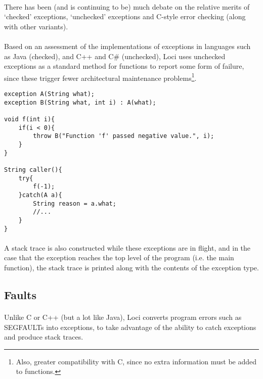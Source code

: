 \documentclass[12pt,twoside,notitlepage]{report}
\begin{document}
\paragraph{}
There has been (and is continuing to be) much debate on the relative merits of `checked' exceptions, `unchecked' exceptions and C-style error checking (along with other variants).

\paragraph{}
Based on an assessment of the implementations of exceptions in languages such as Java (checked), and C++ and C\# (unchecked), Loci uses unchecked exceptions as a standard method for functions to report some form of failure, since these trigger fewer architectural maintenance problems\footnote{Also, greater compatibility with C, since no extra information must be added to functions.}.


\begin{lstlisting}
exception A(String what);
exception B(String what, int i) : A(what);

void f(int i){
	if(i < 0){
		throw B("Function 'f' passed negative value.", i);
	}
}

String caller(){
	try{
		f(-1);
	}catch(A a){
		String reason = a.what;
		//...
	}
}
\end{lstlisting}


\paragraph{}
A stack trace is also constructed while these exceptions are in flight, and in the case that the exception reaches the top level of the program (i.e. the main function), the stack trace is printed along with the contents of the exception type.

\clearpage

\subsection{Faults}

\paragraph{}
Unlike C or C++ (but a lot like Java), Loci converts program errors such as SEGFAULTs into exceptions, to take advantage of the ability to catch exceptions and produce stack traces.
\end{document}
